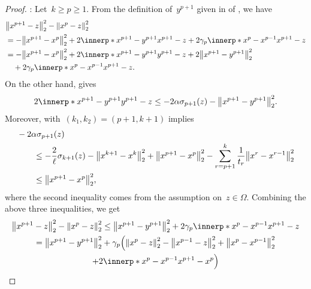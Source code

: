 \documentclass[../main]{subfiles}
\begin{document}
\begin{proof}
    :
    Let~$k \ge p \ge 1$.
    From the definition of~$y^{p + 1}$ given in  of , we have
    \begin{equation}
        \begin{split}
            &\norm*{x^{p + 1} - z}_2^2 - \norm*{x^p - z}_2^2 \\
        &= - \norm*{x^{p + 1} - x^p}_2^2 + 2 \innerp*{x^{p + 1} - y^{p + 1}}{x^{p + 1} - z} + 2 \gamma_p \innerp*{x^p - x^{p - 1}}{x^{p + 1} - z} \\
        &= - \norm*{x^{p + 1} - x^p}_2^2 + 2 \innerp*{x^{p + 1} - y^{p + 1}}{y^{p + 1} - z} + 2 \norm*{x^{p + 1} - y^{p + 1}}_2^2 \\
        &\quad + 2 \gamma_p \innerp*{x^p - x^{p - 1}}{x^{p + 1} - z}
     .   \end{split}
    \end{equation}
    On the other hand,  gives
    \begin{equation}
        2 \innerp*{x^{p + 1} - y^{p + 1}}{y^{p + 1} - z} \le - 2 \alpha \sigma_{p + 1}(z) - \norm*{x^{p + 1} - y^{p + 1}}_2^2
    .\end{equation}
    Moreover,  with~$(k_1, k_2) = (p + 1, k + 1)$ implies
    \begin{equation}
        \begin{split}
            \MoveEqLeft
        - 2 \alpha \sigma_{p + 1}(z) \\
        &\le - \frac{2}{\ell} \sigma_{k + 1}(z) - \norm*{x^{k + 1} - x^k}_2^2 + \norm*{x^{p + 1} - x^p}_2^2 - \sum_{r = p + 1}^{k} \frac{1}{t_r}\norm*{x^r - x^{r - 1}}_2^2 \\
        &\le \norm*{x^{p + 1} - x^p}_2^2
        ,\end{split}
    \end{equation}
    where the second inequality comes from the assumption on~$z \in \Omega$.
    Combining the above three inequalities, we get
    \begin{multline}
        \norm*{x^{p + 1} - z}_2^2 - \norm*{x^p - z}_2^2 \le \norm*{x^{p + 1} - y^{p + 1}}_2^2 + 2 \gamma_p \innerp*{x^p - x^{p - 1}}{x^{p + 1} - z} \\
        = \norm*{x^{p + 1} - y^{p + 1}}_2^2
        + \gamma_p \Bigl( \norm*{x^p - z}_2^2 - \norm*{x^{p - 1} - z}_2^2 + \norm*{x^p - x^{p - 1}}_2^2 \\
    + 2 \innerp*{x^p - x^{p - 1}}{x^{p + 1} - x^p} \Bigr)

\end{multline}
\end{proof}
\end{document}
